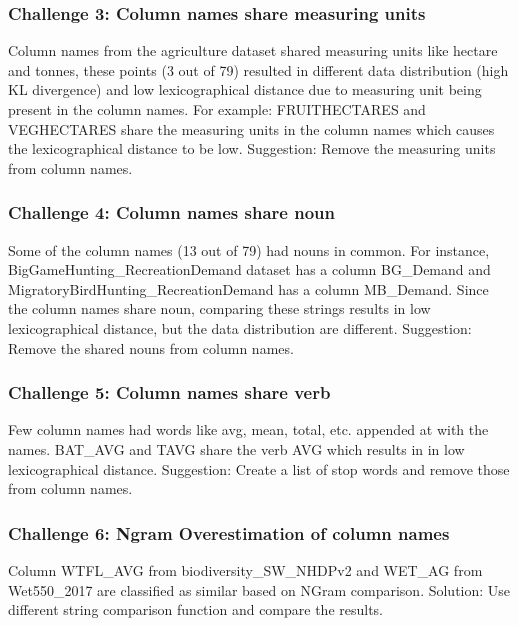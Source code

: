 \subsubsection{Challenge 3: Column names share measuring units}
Column names from the agriculture dataset shared measuring units like hectare and tonnes, these points (3 out of 79) resulted in different data distribution (high KL divergence) and low lexicographical distance due to measuring unit being present in the column names. For example: FRUITHECTARES and VEGHECTARES share the measuring units in the column names which causes the lexicographical distance to be low.
Suggestion: Remove the measuring units from column names.

\subsubsection{Challenge 4: Column names share noun}
Some of the column names (13 out of 79) had nouns in common. For instance, BigGameHunting\_RecreationDemand dataset has a column BG\_Demand and MigratoryBirdHunting\_RecreationDemand has a column MB\_Demand. Since the column names share noun, comparing these strings results in low lexicographical distance, but the data distribution are different.
Suggestion: Remove the shared nouns from column names.


\subsubsection{Challenge 5: Column names share verb}
Few column names had words like avg, mean, total, etc. appended at with the names. BAT\_AVG and TAVG share the verb AVG which results in in low lexicographical distance.
Suggestion: Create a list of stop words and remove those from column names.

\subsubsection{Challenge 6: Ngram Overestimation of column names}
Column WTFL\_AVG from biodiversity\_SW\_NHDPv2 and WET\_AG from Wet550\_2017 are classified as similar based on NGram comparison. 
Solution: Use different string comparison function and compare the results.
